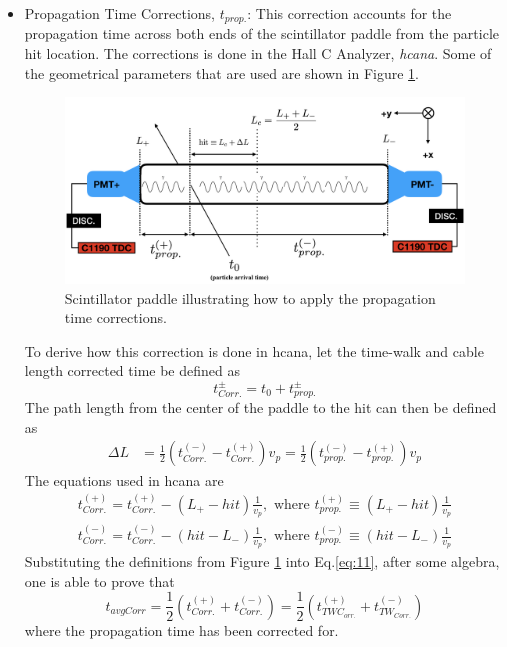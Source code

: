 \documentclass[14pt]{article}
\begin{document}
\begin{itemize}
\item Propagation Time Corrections, $t_{prop.}$: This correction accounts for the propagation
  time across both ends of the scintillator paddle from the particle hit location. The corrections is
  done in the Hall C Analyzer, \textit{hcana}. Some of the geometrical parameters that are used are shown
  in Figure \ref{fig:propTime}. \\
  \begin{figure}[H]
    \captionsetup{justification=raggedright,singlelinecheck=false}
    \includegraphics[scale=0.48]{propTime_Corr.png}
    \caption{Scintillator paddle illustrating how to apply the propagation time corrections.}
    \label{fig:propTime}
  \end{figure}
  To derive how this correction is done in hcana, let the time-walk and cable length corrected time be
  defined as
  \begin{equation}
    t^{\pm}_{Corr.} = t_{0} + t^{\pm}_{prop.}
  \end{equation}
  The path length from the center of the paddle to the hit can then be defined as
    \begin{align}
      \Delta L &= \frac{1}{2}(t^{(-)}_{Corr.} - t^{(+)}_{Corr.})v_{p} =  \frac{1}{2}(t^{(-)}_{prop.} - t^{(+)}_{prop.})v_{p}
    \end{align}
    The equations used in hcana are
    \begin{align}\label{eq:11}
      t^{(+)}_{Corr.} = t^{(+)}_{Corr.} - (L_{+} - hit)\frac{1}{v_{p}}, \text{ where } t^{(+)}_{prop.}\equiv(L_{+} - hit)\frac{1}{v_{p}} \nonumber \\
      t^{(-)}_{Corr.} = t^{(-)}_{Corr.} - (hit - L_{-})\frac{1}{v_{p}}, \text{ where } t^{(-)}_{prop.}\equiv(hit - L_{-})\frac{1}{v_{p}}       
    \end{align}
    Substituting the definitions from Figure \ref{fig:propTime}  into Eq.\ref{eq:11}, after some algebra, one is able to prove that
    \begin{equation}
      t_{avgCorr} = \frac{1}{2}( t^{(+)}_{Corr.} +  t^{(-)}_{Corr.}) = \frac{1}{2} (t^{(+)}_{TWC_{orr.}} +  t^{(-)}_{TW_{Corr.}})
    \end{equation}
    where the propagation time has been corrected for.
\end{itemize}
\end{document}
